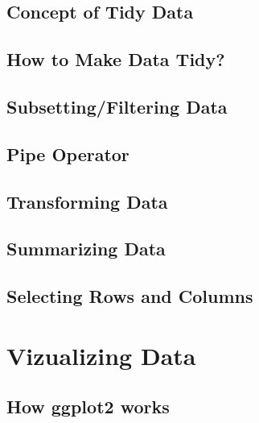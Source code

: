 \documentclass[
]{book}
\begin{document}
\hypertarget{concept-of-tidy-data}{%
\subsection{Concept of Tidy Data}\label{concept-of-tidy-data}}

\hypertarget{how-to-make-data-tidy}{%
\subsection{How to Make Data Tidy?}\label{how-to-make-data-tidy}}

\hypertarget{subsettingfiltering-data}{%
\subsection{Subsetting/Filtering Data}\label{subsettingfiltering-data}}

\hypertarget{pipe-operator}{%
\subsection{Pipe Operator}\label{pipe-operator}}

\hypertarget{transforming-data}{%
\subsection{Transforming Data}\label{transforming-data}}

\hypertarget{summarizing-data}{%
\subsection{Summarizing Data}\label{summarizing-data}}

\hypertarget{selecting-rows-and-columns}{%
\subsection{Selecting Rows and Columns}\label{selecting-rows-and-columns}}

\hypertarget{vizualizing-data}{%
\section{Vizualizing Data}\label{vizualizing-data}}

\hypertarget{how-ggplot2-works}{%
\subsection{How ggplot2 works}\label{how-ggplot2-works}}
\end{document}
